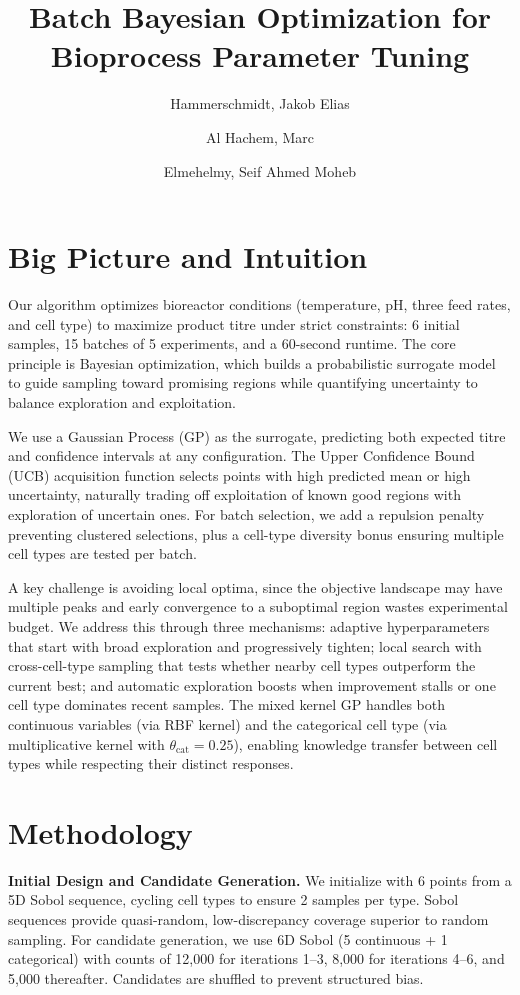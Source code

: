 \documentclass[11pt,a4paper]{article}
\title{\vspace{-0.5cm}\textbf{Batch Bayesian Optimization for Bioprocess Parameter Tuning}}
\author{Hammerschmidt, Jakob Elias \and Al Hachem, Marc \and Elmehelmy, Seif Ahmed Moheb}
\date{}
\begin{document}
\maketitle
\vspace{-0.5cm}

\section{Big Picture and Intuition}

Our algorithm optimizes bioreactor conditions (temperature, pH, three feed rates, and cell type) to maximize product titre under strict constraints: 6 initial samples, 15 batches of 5 experiments, and a 60-second runtime.
The core principle is Bayesian optimization, which builds a probabilistic surrogate model to guide sampling toward promising regions while quantifying uncertainty to balance exploration and exploitation.

We use a Gaussian Process (GP) as the surrogate, predicting both expected titre and confidence intervals at any configuration.
The Upper Confidence Bound (UCB) acquisition function selects points with high predicted mean or high uncertainty, naturally trading off exploitation of known good regions with exploration of uncertain ones.
For batch selection, we add a repulsion penalty preventing clustered selections, plus a cell-type diversity bonus ensuring multiple cell types are tested per batch.

A key challenge is avoiding local optima, since the objective landscape may have multiple peaks and early convergence to a suboptimal region wastes experimental budget.
We address this through three mechanisms: adaptive hyperparameters that start with broad exploration and progressively tighten; local search with cross-cell-type sampling that tests whether nearby cell types outperform the current best; and automatic exploration boosts when improvement stalls or one cell type dominates recent samples.
The mixed kernel GP handles both continuous variables (via RBF kernel) and the categorical cell type (via multiplicative kernel with $\theta_{\text{cat}}=0.25$), enabling knowledge transfer between cell types while respecting their distinct responses.

\section{Methodology}

\textbf{Initial Design and Candidate Generation.}
We initialize with 6 points from a 5D Sobol sequence, cycling cell types to ensure 2 samples per type.
Sobol sequences provide quasi-random, low-discrepancy coverage superior to random sampling.
For candidate generation, we use 6D Sobol (5 continuous + 1 categorical) with counts of 12,000 for iterations 1--3, 8,000 for iterations 4--6, and 5,000 thereafter.
Candidates are shuffled to prevent structured bias.
\end{document}
